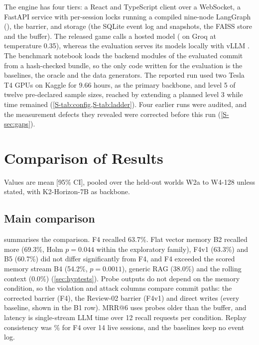 \documentclass[letterpaper,journal]{IEEEtran}
\begin{document}
The engine has four tiers: a React and TypeScript client over a WebSocket, a FastAPI service with per-session locks running a compiled nine-node LangGraph  (), the barrier, and storage (the SQLite event log and snapshots, the FAISS store and the buffer). The released game calls a hosted model ( on Groq at temperature 0.35), whereas the evaluation serves its models locally with vLLM \cite{kwon2023vllm}. The benchmark notebook  loads the backend modules of the evaluated commit from a hash-checked bundle, so the only code written for the evaluation is the baselines, the oracle and the data generators. The reported run used two Tesla T4 GPUs on Kaggle for 9.66 hours,  as the primary backbone, and level 5 of twelve pre-declared sample sizes, reached by extending a planned level 3 while time remained (\cref{S-tab:config,S-tab:ladder}). Four earlier runs were audited, and the measurement defects they revealed were corrected before this run (\cref{S-sec:gaps}).

\section{Comparison of Results}\label{sec:results}

Values are mean [95\% CI], pooled over the held-out worlds W2a to W4-128 unless stated, with K2-Horizon-7B as backbone.

\subsection{Main comparison}\label{sec:main}
 summarises the comparison. F4 recalled 63.7\%. Flat vector memory B2 recalled more (69.3\%, Holm $p=0.044$ within the exploratory family), F4v1 (63.3\%) and B5 (60.7\%) did not differ significantly from F4, and F4 exceeded the scored memory stream B4 (54.2\%, $p=0.0011$), generic RAG (38.0\%) and the rolling context (0.0\%) (\cref{sec:hyptests}). Probe outputs do not depend on the memory condition, so the violation and attack columns compare commit paths: the corrected barrier (F4), the Review-02 barrier (F4v1) and direct writes (every baseline, shown in the B1 row). MRR@6 uses probes older than the buffer, and latency is single-stream LLM time over 12 recall requests per condition. Replay consistency was \% for F4 over 14 live sessions, and the baselines keep no event log.
\end{document}

